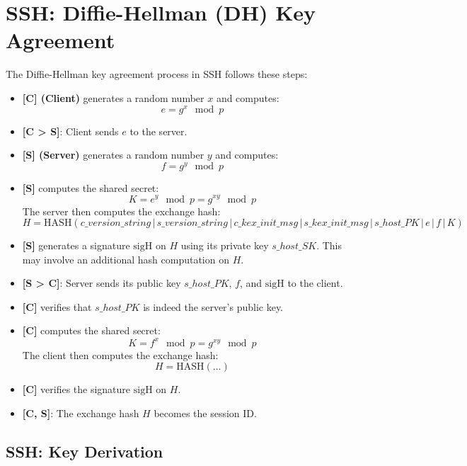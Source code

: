 \section*{SSH: Diffie-Hellman (DH) Key Agreement}

The Diffie-Hellman key agreement process in SSH follows these steps:

\begin{itemize}[itemsep=0pt]
    \item \textbf{[C] (Client)} generates a random number \( x \) and computes:
    \[
    e = g^x \mod p
    \]
    \item \textbf{[C > S]}: Client sends \( e \) to the server.
    
    \item \textbf{[S] (Server)} generates a random number \( y \) and computes:
    \[
    f = g^y \mod p
    \]
    \item \textbf{[S]} computes the shared secret:
    \[
    K = e^y \mod p = g^{xy} \mod p
    \]
    The server then computes the exchange hash:
    \[
    H = \text{HASH}( c\_version\_string \,|\, s\_version\_string \,|\, c\_kex\_init\_msg \,|\, s\_kex\_init\_msg \,|\, s\_host\_PK \,|\, e \,|\, f \,|\, K )
    \]
    \item \textbf{[S]} generates a signature \( \text{sigH} \) on \( H \) using its private key \( s\_host\_SK \). This may involve an additional hash computation on \( H \).
    
    \item \textbf{[S > C]}: Server sends its public key \( s\_host\_PK \), \( f \), and \( \text{sigH} \) to the client.
    
    \item \textbf{[C]} verifies that \( s\_host\_PK \) is indeed the server's public key.
    
    \item \textbf{[C]} computes the shared secret:
    \[
    K = f^x \mod p = g^{xy} \mod p
    \]
    The client then computes the exchange hash:
    \[
    H = \text{HASH}( \ldots )
    \]
    \item \textbf{[C]} verifies the signature \( \text{sigH} \) on \( H \).

    \item \textbf{[C, S]}: The exchange hash \( H \) becomes the session ID.
\end{itemize}

\subsection{SSH: Key Derivation}

